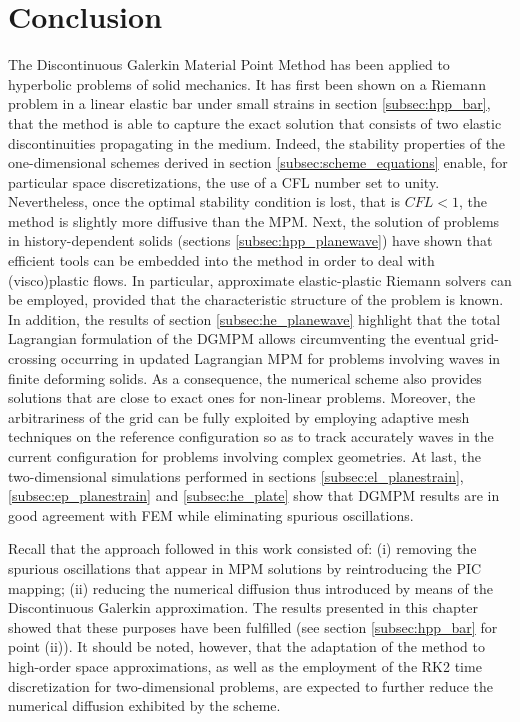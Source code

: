 \section{Conclusion}
The Discontinuous Galerkin Material Point Method has been applied to hyperbolic problems of solid mechanics.
It has first been shown on a Riemann problem in a linear elastic bar under small strains in section \ref{subsec:hpp_bar}, that the method is able to capture the exact solution that consists of two elastic discontinuities propagating in the medium.
Indeed, the stability properties of the one-dimensional schemes derived in section \ref{subsec:scheme_equations} enable, for particular space discretizations, the use of a CFL number set to unity.
Nevertheless, once the optimal stability condition is lost, that is $CFL <1$, the method is slightly more diffusive than the MPM.
Next, the solution of problems in history-dependent solids (sections \ref{subsec:hpp_planewave}) have shown that efficient tools can be embedded into the method in order to deal with (visco)plastic flows. 
In particular, approximate elastic-plastic Riemann solvers can be employed, provided that the characteristic structure of the problem is known.
In addition, the results of section \ref{subsec:he_planewave} highlight that the total Lagrangian formulation of the DGMPM allows circumventing the eventual grid-crossing occurring in updated Lagrangian MPM for problems involving waves in finite deforming solids.
As a consequence, the numerical scheme also provides solutions that are close to exact ones for non-linear problems.
Moreover, the arbitrariness of the grid can be fully exploited by employing adaptive mesh techniques on the reference configuration so as to track accurately waves in the current configuration for problems involving complex geometries.
At last, the two-dimensional simulations performed in sections \ref{subsec:el_planestrain}, \ref{subsec:ep_planestrain} and \ref{subsec:he_plate} show that DGMPM results are in good agreement with FEM while eliminating spurious oscillations.

Recall that the approach followed in this work consisted of: (i) removing the spurious oscillations that appear in MPM solutions by reintroducing the PIC mapping; (ii) reducing the numerical diffusion thus introduced by means of the Discontinuous Galerkin approximation.
The results presented in this chapter showed that these purposes have been fulfilled (see section \ref{subsec:hpp_bar} for point (ii)).
It should be noted, however, that the adaptation of the method to high-order space approximations, as well as the employment of the RK2 time discretization for two-dimensional problems, are expected to further reduce the numerical diffusion exhibited by the scheme. 


